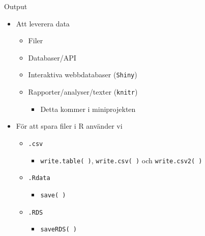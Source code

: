 \documentclass[
  11pt,
  ignorenonframetext,
]{beamer}
\providecommand{\tightlist}{%
  \setlength{\itemsep}{0pt}\setlength{\parskip}{0pt}}
\begin{document}
\begin{frame}{Output}
\protect\hypertarget{output}{}
\begin{itemize}
\tightlist
\item
  Att leverera data

  \begin{itemize}
  \tightlist
  \item
    Filer
  \item
    Databaser/API
  \item
    Interaktiva webbdatabaser (\texttt{Shiny})
  \item
    Rapporter/analyser/texter (\texttt{knitr})

    \begin{itemize}
    \tightlist
    \item
      Detta kommer i miniprojekten
    \end{itemize}
  \end{itemize}
\end{itemize}

\pause

\begin{itemize}
\tightlist
\item
  För att spara filer i R använder vi

  \begin{itemize}
  \tightlist
  \item
    \texttt{.csv}

    \begin{itemize}
    \tightlist
    \item
      \texttt{write.table( )}, \texttt{write.csv( )} och
      \texttt{write.csv2( )}
    \end{itemize}
  \item
    \texttt{.Rdata}

    \begin{itemize}
    \tightlist
    \item
      \texttt{save( )}
    \end{itemize}
  \item
    \texttt{.RDS}

    \begin{itemize}
    \tightlist
    \item
      \texttt{saveRDS( )}
    \end{itemize}
  \end{itemize}
\end{itemize}
\end{frame}
\end{document}
